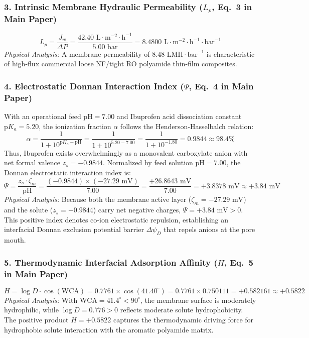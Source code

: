 \documentclass[11pt]{article}
\begin{document}
\subsubsection{3. Intrinsic Membrane Hydraulic Permeability ($L_p$, Eq.~3 in Main Paper)}
\begin{equation}
L_p = \frac{J_w}{\Delta P} = \frac{42.40\text{ L}\cdot\text{m}^{-2}\cdot\text{h}^{-1}}{5.00\text{ bar}} = 8.4800\text{ L}\cdot\text{m}^{-2}\cdot\text{h}^{-1}\cdot\text{bar}^{-1}
\end{equation}
\noindent\textit{Physical Analysis:} A membrane permeability of $8.48\text{ LMH}\cdot\text{bar}^{-1}$ is characteristic of high-flux commercial loose NF/tight RO polyamide thin-film composites.

\subsubsection{4. Electrostatic Donnan Interaction Index ($\Psi$, Eq.~4 in Main Paper)}
With an operational feed $\mathrm{pH} = 7.00$ and Ibuprofen acid dissociation constant $\mathrm{p}K_a = 5.20$, the ionization fraction $\alpha$ follows the Henderson-Hasselbalch relation:
\begin{equation}
\alpha = \frac{1}{1 + 10^{\mathrm{p}K_a - \mathrm{pH}}} = \frac{1}{1 + 10^{5.20 - 7.00}} = \frac{1}{1 + 10^{-1.80}} = 0.9844 \approx 98.4\%
\end{equation}
Thus, Ibuprofen exists overwhelmingly as a monovalent carboxylate anion with net formal valence $z_s = -0.9844$. Normalized by feed solution $\mathrm{pH} = 7.00$, the Donnan electrostatic interaction index is:
\begin{equation}
\Psi = \frac{z_s \cdot \zeta_m}{\mathrm{pH}} = \frac{(-0.9844) \times (-27.29\text{ mV})}{7.00} = \frac{+26.8643\text{ mV}}{7.00} = +3.8378\text{ mV} \approx +3.84\text{ mV}
\end{equation}
\noindent\textit{Physical Analysis:} Because both the membrane active layer ($\zeta_m = -27.29\text{ mV}$) and the solute ($z_s = -0.9844$) carry net negative charges, $\Psi = +3.84\text{ mV} > 0$. This positive index denotes co-ion electrostatic repulsion, establishing an interfacial Donnan exclusion potential barrier $\Delta\psi_D$ that repels anions at the pore mouth.

\subsubsection{5. Thermodynamic Interfacial Adsorption Affinity ($H$, Eq.~5 in Main Paper)}
\begin{equation}
H = \log D \cdot \cos(\mathrm{WCA}) = 0.7761 \times \cos(41.40^\circ) = 0.7761 \times 0.750111 = +0.582161 \approx +0.5822
\end{equation}
\noindent\textit{Physical Analysis:} With $\mathrm{WCA} = 41.4^\circ < 90^\circ$, the membrane surface is moderately hydrophilic, while $\log D = 0.776 > 0$ reflects moderate solute hydrophobicity. The positive product $H = +0.5822$ captures the thermodynamic driving force for hydrophobic solute interaction with the aromatic polyamide matrix.
\end{document}
